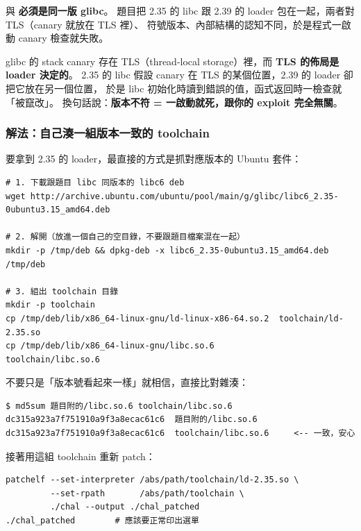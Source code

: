 \begin{warnbox}[一句話總結這個雷]
 與  \textbf{必須是同一版 glibc}。
題目把 2.35 的 libc 跟 2.39 的 loader 包在一起，兩者對 TLS（canary 就放在 TLS 裡）、
符號版本、內部結構的認知不同，於是程式一啟動 canary 檢查就失敗。
\end{warnbox}

\begin{whybox}
glibc 的 stack canary 存在 TLS（thread-local storage）裡，而 \textbf{TLS 的佈局是 loader 決定的}。
2.35 的 libc 假設 canary 在 TLS 的某個位置，2.39 的 loader 卻把它放在另一個位置，
於是 libc 初始化時讀到錯誤的值，函式返回時一檢查就「被竄改」。
換句話說：\textbf{版本不符 = 一啟動就死，跟你的 exploit 完全無關}。
\end{whybox}

\subsubsection{解法：自己湊一組版本一致的 toolchain}

要拿到 2.35 的 loader，最直接的方式是抓對應版本的 Ubuntu 套件：

\begin{lstlisting}[style=sh]
# 1. 下載跟題目 libc 同版本的 libc6 deb
wget http://archive.ubuntu.com/ubuntu/pool/main/g/glibc/libc6_2.35-0ubuntu3.15_amd64.deb

# 2. 解開（放進一個自己的空目錄，不要跟題目檔案混在一起）
mkdir -p /tmp/deb && dpkg-deb -x libc6_2.35-0ubuntu3.15_amd64.deb /tmp/deb

# 3. 組出 toolchain 目錄
mkdir -p toolchain
cp /tmp/deb/lib/x86_64-linux-gnu/ld-linux-x86-64.so.2  toolchain/ld-2.35.so
cp /tmp/deb/lib/x86_64-linux-gnu/libc.so.6             toolchain/libc.so.6
\end{lstlisting}

\begin{keybox}
不要只是「版本號看起來一樣」就相信，直接比對雜湊：

\begin{lstlisting}[style=sh]
$ md5sum 題目附的/libc.so.6 toolchain/libc.so.6
dc315a923a7f751910a9f3a8ecac61c6  題目附的/libc.so.6
dc315a923a7f751910a9f3a8ecac61c6  toolchain/libc.so.6     <-- 一致，安心
\end{lstlisting}
\end{keybox}

接著用這組 toolchain 重新 patch：

\begin{lstlisting}[style=sh]
patchelf --set-interpreter /abs/path/toolchain/ld-2.35.so \
         --set-rpath       /abs/path/toolchain \
         ./chal --output ./chal_patched
./chal_patched        # 應該要正常印出選單
\end{lstlisting}

